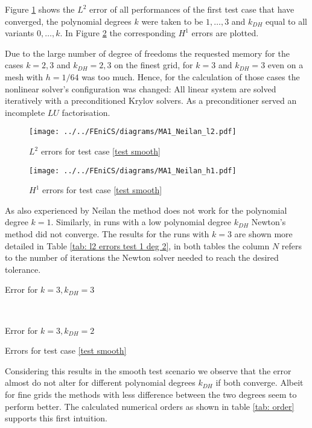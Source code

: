 
Figure \ref{fig: l2 errors test 1} shows the $L^2$ error of all performances of the first test case that have converged, the polynomial degrees $k$ were taken to be $1,\dots,3$ and $k_{DH}$ equal to all variants $0, \dots, k$. In Figure \ref{fig: h1 errors test 1} the corresponding $H^1$ errors are plotted.

Due to the large number of degree of freedoms the requested memory for the cases $k=2,3$ and $k_{DH}=2,3$ on the finest grid, for $k=3$ and $k_{DH}=3$ even on a mesh with $h=1/64$ was too much. Hence, for the calculation of those cases the nonlinear solver's configuration was changed: All linear system are solved iteratively with a preconditioned Krylov solvers. As a preconditioner served an incomplete $LU$ factorisation.

\begin{figure}[H]
\centering
	\texttt{[image: ../../FEniCS/diagrams/MA1\_Neilan\_l2.pdf]}
	\caption{$L^2$ errors for test case \ref{test smooth}}
	\label{fig: l2 errors test 1}
\end{figure}
\begin{figure}[H]
\centering
	\texttt{[image: ../../FEniCS/diagrams/MA1\_Neilan\_h1.pdf]}
	\caption{$H^1$ errors for test case \ref{test smooth}}
	\label{fig: h1 errors test 1}
\end{figure}

As also experienced by Neilan the method does not work for the polynomial degree $k=1$. Similarly, in runs with a low polynomial degree $k_{DH}$ Newton's method did not converge.
The results for the runs with $k=3$ are shown more detailed in Table \ref{tab: l2 errors test 1 deg 2}, in both tables the column $N$ refers to the number of iterations the Newton solver needed to reach the desired tolerance. 
\begin{table}[H]
	\begin{subtable}[b]{0.45\textwidth}
		\centering
		\pgfplotstabletypeset[columns={iterations, l2error, h1error,N},
				    every row 0 column 0/.style={set content=init},
		]\MAOnedegThreeThree
    	\caption{Error for $k=3, k_{DH}=3$}
   \end{subtable}
   ~
	\begin{subtable}[b]{0.45\textwidth}
		\centering
		\pgfplotstabletypeset[columns={iterations, l2error, h1error,N},
				    every row 0 column 0/.style={set content=init},
		]\MAOnedegThreeTwo
 	\caption{Error for $k=3, k_{DH}=2$}
	\end{subtable}
	\caption{Errors for test case \ref{test smooth}}
	\label{tab: l2 errors test 1 deg 2}
\end{table}
Considering this results in the smooth test scenario we observe that the error almost do not alter for different polynomial degrees $k_{DH}$ if both converge. Albeit for fine grids the methods with less difference between the two degrees seem to perform better. The calculated numerical orders as shown in table \ref{tab: order} supports this first intuition.

